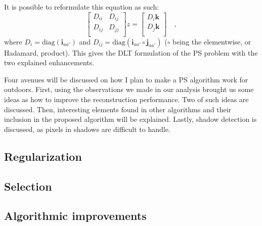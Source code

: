 \documentclass{report}
\begin{document}
It is possible to reformulate this equation as such:
\begin{equation}
\begin{bmatrix}
D_{ii} & D_{ij} \\
D_{ij} & D_{jj} \\
\end{bmatrix}
z =
\begin{bmatrix}
D_i \mathbf{k} \\
D_j \mathbf{k} \\
\end{bmatrix} \quad,
\end{equation}
where $D_i = \mathrm{diag}(\mathbf{i}_{aa'})$ and $ D_{ij} = \mathrm{diag}\left(\mathbf{i}_{aa'} \circ \mathbf{j}_{aa'}\right)$ ($\circ$ being the elementwise, or Hadamard, product). This gives the DLT formulation of the PS problem with the two explained enhancements.


Four avenues will be discussed on how I plan to make a PS algorithm work for outdoors. First, using the observations we made in our analysis brought us some ideas as how to improve the reconstruction performance. Two of such ideas are discussed. Then, interesting elements found in other algorithms and their inclusion in the proposed algorithm will be explained. Lastly, shadow detection is discussed, as pixels in shadows are difficult to handle.

\subsection{Regularization}



\subsection{Selection}


\subsection{Algorithmic improvements}
\end{document}
